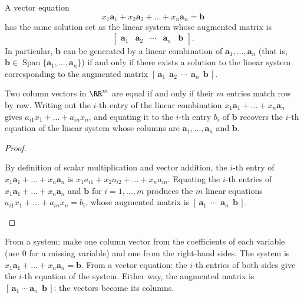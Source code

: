 \documentclass[10pt]{scrartcl}
\newcommand{\vv}[1]{\mathbf{#1}}
\DeclareMathOperator{\spn}{Span}
\begin{document}
\begin{proposition*}
  A vector equation
  \[
    x_1\vv a_1 + x_2\vv a_2 + \dots + x_n\vv a_n = \vv b
  \]
  has the same solution set as the linear system whose augmented matrix is
  \[
    \begin{bmatrix} \vv a_1 & \vv a_2 & \cdots & \vv a_n & \vv b \end{bmatrix}.
  \]
  In particular, $\vv b$ can be generated by a linear combination of $\vv a_1,\dots,\vv a_n$ (that is, $\vv b\in\spn\{\vv a_1,\dots,\vv a_n\}$) if and only if there exists a solution to the linear system corresponding to the augmented matrix $[\,\vv a_1\ \ \vv a_2\ \ \cdots\ \ \vv a_n\ \ \vv b\,]$.
\end{proposition*}
\begin{ideabox}
  Two column vectors in $\RR^m$ are equal if and only if their $m$ entries match row by row. Writing out the $i$-th entry of the linear combination $x_1\vv a_1+\dots+x_n\vv a_n$ gives $a_{i1}x_1+\dots+a_{in}x_n$, and equating it to the $i$-th entry $b_i$ of $\vv b$ recovers the $i$-th equation of the linear system whose columns are $\vv a_1,\dots,\vv a_n$ and $\vv b$.
\end{ideabox}
\begin{proof}
  \begin{steps}
    \ii By definition of scalar multiplication and vector addition, the $i$-th entry of $x_1\vv a_1+\dots+x_n\vv a_n$ is $x_1a_{i1}+x_2a_{i2}+\dots+x_na_{in}$.
    \ii Equating the $i$-th entries of $x_1\vv a_1+\dots+x_n\vv a_n$ and $\vv b$ for $i=1,\dots,m$ produces the $m$ linear equations $a_{i1}x_1+\dots+a_{in}x_n=b_i$, whose augmented matrix is $[\,\vv a_1\ \ \cdots\ \ \vv a_n\ \ \vv b\,]$.
  \end{steps}
\end{proof}

\begin{steps}
  \ii From a system: make one column vector from the coefficients of each variable (use $0$ for a missing variable) and one from the right-hand sides. The system is $x_1\vv a_1+\dots+x_n\vv a_n=\vv b$.
  \ii From a vector equation: the $i$-th entries of both sides give the $i$-th equation of the system.
  \ii Either way, the augmented matrix is $[\,\vv a_1\ \cdots\ \vv a_n\ \ \vv b\,]$: the vectors become its columns.
\end{steps}
\end{document}
